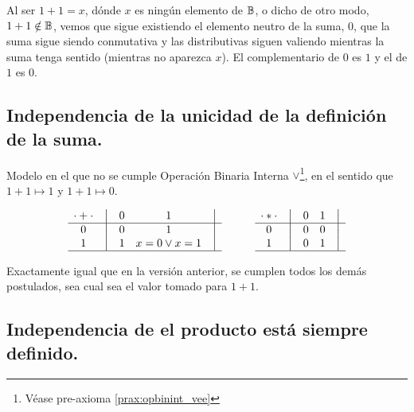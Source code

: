 	Al ser \(1 + 1 = x\), dónde \(x\) es ningún elemento de $\mathbb{B}$, o dicho
de otro modo, \(1 + 1 \notin \mathbb{B}\), vemos que sigue existiendo el elemento
neutro de la suma, \(0\), que la suma sigue siendo conmutativa y las
distributivas siguen valiendo mientras la suma tenga sentido (mientras no
aparezca \(x\)). El complementario de \(0\) es \(1\) y el de \(1\) es \(0\).



\subsection{Independencia de la unicidad de la definición de la suma.}

Modelo en el que no se cumple Operación Binaria Interna $\vee$\footnote{Véase pre-axioma \ref{prax:opbinint_vee}}, en el sentido que \(1 + 1
\mapsto 1\) y \(1 + 1 \mapsto 0\).


\[
    \begin{matrix}
        {\cdot + \cdot} & \big{\vert} & {0} & {1} & \big{\vert} \\
        \hline
        {0}             & \big{\vert} & {0} & {1} & \big{\vert} \\
        {1}             & \big{\vert} & {1} & {x=0 \vee x=1} & \big{\vert} \\
        \hline
    \end{matrix}
    \qquad\qquad
    \begin{matrix}
        {\cdot * \cdot} & \big{\vert} & {0} & {1} & \big{\vert} \\
        \hline
        {0}                   & \big{\vert} & {0} & {0} & \big{\vert} \\
        {1}                   & \big{\vert} & {0} & {1} & \big{\vert} \\
        \hline
    \end{matrix}
\]



Exactamente igual que en la versión anterior, se cumplen todos los demás
postulados, sea cual sea el valor tomado para \(1 + 1\).



\subsection{Independencia de el producto está siempre definido.}



